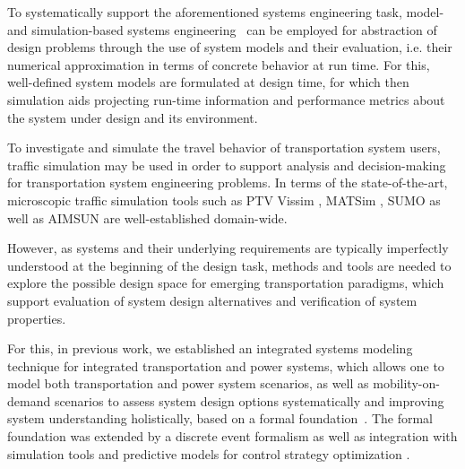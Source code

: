 \documentclass[a4paper,twoside]{article}
\begin{document}
	
	To systematically support the aforementioned systems engineering task, model- and simulation-based systems engineering~\cite{gianni2014modeling} can be employed for abstraction of design problems through the use of system models and their evaluation, i.e. their numerical approximation in terms of concrete behavior at run time. For this, well-defined system models are formulated at design time, for which then simulation aids projecting run-time information and performance metrics about the system under design and its environment. 
	
	To investigate and simulate the travel behavior of transportation system users, traffic simulation may be used in order to support analysis and decision-making for transportation system engineering problems. In terms of the state-of-the-art, microscopic traffic simulation tools such as PTV Vissim \cite{fellendorf_vissim_1994}, MATSim \cite{w_axhausen_multi-agent_2016}, SUMO \cite{lopez_microscopic_2018} as well as AIMSUN \cite{barcelo2005dynamic} are well-established domain-wide.
	
	However, as systems and their underlying requirements are typically imperfectly understood at the beginning of the design task, methods and tools are needed to explore the possible design space for emerging transportation paradigms, which support evaluation of system design alternatives and verification of system properties. 
	
	
	For this, in previous work, we established an integrated systems modeling technique for integrated transportation and power systems, which allows one to model both transportation and power system scenarios, as well as mobility-on-demand scenarios to assess system design options systematically and improving system understanding holistically, based on a formal foundation~\cite{ascher_hackenberg_2014,ascher_hackenberg_2015,ascher_hackenberg_2016,ascher_hackenberg_2017}. The formal foundation was extended by a discrete event formalism \cite{ascher2023discrete} as well as integration with simulation tools and predictive models for control strategy optimization \cite{ascher_hackenberg_albayrak_2023}.
	
\end{document}
